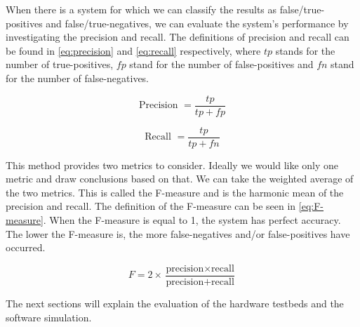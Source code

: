 When there is a system for which we can classify the results as false/true-positives and false/true-negatives, we can evaluate the system's performance by investigating the precision and recall.
The definitions of precision and recall can be found in \autoref{eq:precision} and \autoref{eq:recall} respectively, where $tp$ stands for the number of true-positives, $fp$ stand for the number of false-positives and $fn$ stand for the number of false-negatives.

\begin{equation}
	\label{eq:precision}
	\text{Precision } = \frac{tp}{tp + fp}
\end{equation}

\begin{equation}
	\label{eq:recall}
	\text{Recall } = \frac{tp}{tp + fn}
\end{equation}

This method provides two metrics to consider.
Ideally we would like only one metric and draw conclusions based on that.
We can take the weighted average of the two metrics.
This is called the F-measure \cite{sokolova2009systematic} and is the harmonic mean of the precision and recall.
The definition of the F-measure can be seen in \autoref{eq:F-measure}.
When the F-measure is equal to 1, the system has perfect accuracy.
The lower the F-measure is, the more false-negatives and/or false-positives have occurred.

\begin{equation}
	\label{eq:F-measure}
	F = 2 \times \frac{\text{precision} \times \text{recall}}{\text{precision} + \text{recall}}
\end{equation}



The next sections will explain the evaluation of the hardware testbeds and the software simulation.









